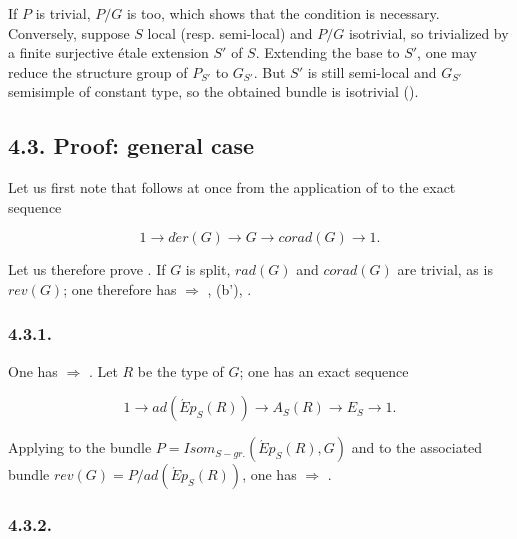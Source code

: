If \(P\) is trivial, \(P / G\) is too, which shows that the condition is necessary. Conversely, suppose \(S\) local (resp.
semi-local) and \(P / G\) isotrivial, so trivialized by a finite surjective étale extension \(S'\) of \(S\). Extending the
base to \(S'\), one may reduce the structure group of \(P_{S'}\) to \(G_{S'}\). But \(S'\) is still semi-local and \(G_{S'}\)
semisimple of constant type, so the obtained bundle is isotrivial ().

\subsection*{4.3. Proof: general case}

Let us first note that  follows at once from the application of  to the exact sequence

\[ 1 \to d\acute{e}r(G) \to G \to corad(G) \to 1. \]

Let us therefore prove . If \(G\) is split, \(rad(G)\) and \(corad(G)\) are trivial, as is \(rev(G)\); one therefore has  \(\Rightarrow\) ,
(b'), .

\subsubsection*{4.3.1.}

One has  \(\Rightarrow\) . Let \(R\) be the type of \(G\); one has an exact sequence

\[ 1 \to ad(\acute{E}p_{S}(R)) \to A_{S}(R) \to E_{S} \to 1. \]

Applying  to the bundle \(P = Isom_{S-gr.}(\acute{E}p_{S}(R), G)\) and to the associated bundle \(rev(G) = P /
ad(\acute{E}p_{S}(R))\), one has  \(\Rightarrow\) .

\subsubsection*{4.3.2.}


